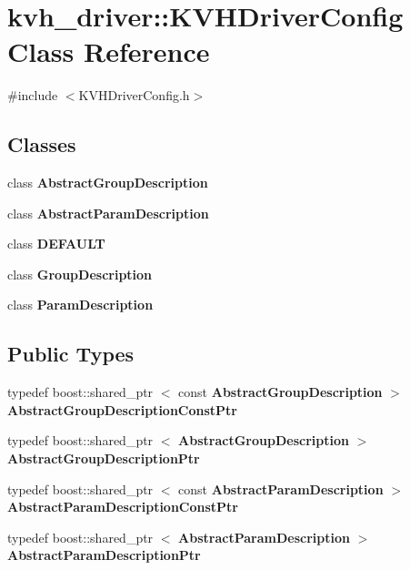 \section{kvh\-\_\-driver\-:\-:\-K\-V\-H\-Driver\-Config \-Class \-Reference}
\label{classkvh__driver_1_1KVHDriverConfig}


{\ttfamily \#include $<$\-K\-V\-H\-Driver\-Config.\-h$>$}

\subsection*{\-Classes}
\begin{DoxyCompactItemize}
\item 
class {\bf \-Abstract\-Group\-Description}
\item 
class {\bf \-Abstract\-Param\-Description}
\item 
class {\bf \-D\-E\-F\-A\-U\-L\-T}
\item 
class {\bf \-Group\-Description}
\item 
class {\bf \-Param\-Description}
\end{DoxyCompactItemize}
\subsection*{\-Public \-Types}
\begin{DoxyCompactItemize}
\item 
typedef boost\-::shared\-\_\-ptr\*
$<$ const \*
{\bf \-Abstract\-Group\-Description} $>$ {\bf \-Abstract\-Group\-Description\-Const\-Ptr}
\item 
typedef boost\-::shared\-\_\-ptr\*
$<$ {\bf \-Abstract\-Group\-Description} $>$ {\bf \-Abstract\-Group\-Description\-Ptr}
\item 
typedef boost\-::shared\-\_\-ptr\*
$<$ const \*
{\bf \-Abstract\-Param\-Description} $>$ {\bf \-Abstract\-Param\-Description\-Const\-Ptr}
\item 
typedef boost\-::shared\-\_\-ptr\*
$<$ {\bf \-Abstract\-Param\-Description} $>$ {\bf \-Abstract\-Param\-Description\-Ptr}
\end{DoxyCompactItemize}
